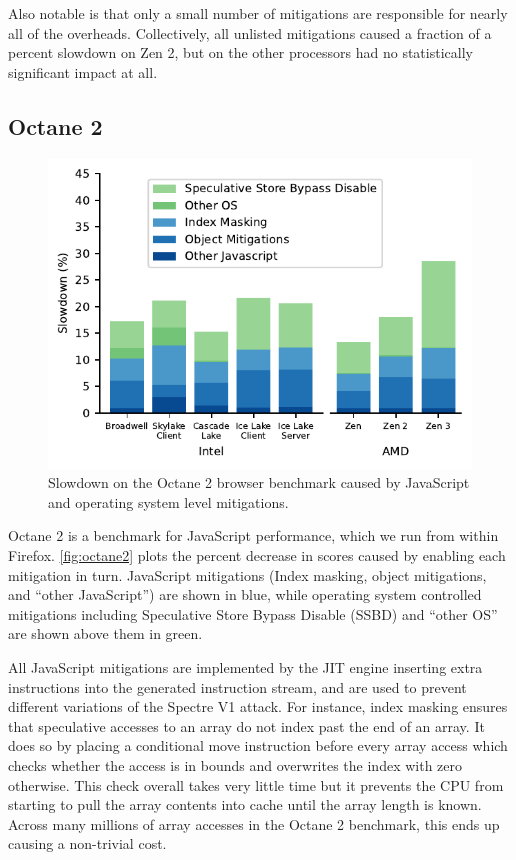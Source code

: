 Also notable is that only a small number of mitigations are responsible for nearly all of the overheads.
Collectively, all unlisted mitigations caused a fraction of a percent slowdown on Zen 2, but on the other processors had no statistically significant impact at all.

\subsection{Octane 2}
\label{sec:benchmarks:octane-2}

\begin{figure}[t]
    \includegraphics[width=\columnwidth]{plots/octane2.pdf}
    \caption{Slowdown on the Octane 2 browser benchmark caused by JavaScript and operating system level mitigations.}
    \label{fig:octane2}
\end{figure}

Octane 2 is a benchmark for JavaScript performance, which we run from within Firefox.
\autoref{fig:octane2} plots the percent decrease in scores caused by enabling each mitigation in turn.
JavaScript mitigations (Index masking, object mitigations, and ``other JavaScript'') are shown in blue, while operating system controlled mitigations including Speculative Store Bypass Disable (SSBD) and ``other OS'' are shown above them in green.

All JavaScript mitigations are implemented by the JIT engine inserting extra instructions into the generated instruction stream, and are used to prevent different variations of the Spectre V1 attack.
For instance, index masking ensures that speculative accesses to an array do not index past the end of an array.
It does so by placing a conditional move instruction before every array access which checks whether the access is in bounds and overwrites the index with zero otherwise.
This check overall takes very little time but it prevents the CPU from starting to pull the array contents into cache until the array length is known.
Across many millions of array accesses in the Octane 2 benchmark, this ends up causing a non-trivial cost.

